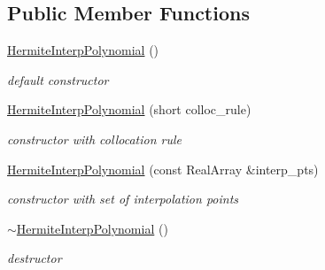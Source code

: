 \subsection*{Public Member Functions}
\begin{DoxyCompactItemize}
\item 
\hyperlink{classPecos_1_1HermiteInterpPolynomial_ae13b0c3cd4bfb21c1e46fcd1deef7752}{Hermite\+Interp\+Polynomial} ()\label{classPecos_1_1HermiteInterpPolynomial_ae13b0c3cd4bfb21c1e46fcd1deef7752}

\begin{DoxyCompactList}\small\item\em default constructor \end{DoxyCompactList}\item 
\hyperlink{classPecos_1_1HermiteInterpPolynomial_aee3ed983c4e1ada90870429465dfdd3f}{Hermite\+Interp\+Polynomial} (short colloc\+\_\+rule)\label{classPecos_1_1HermiteInterpPolynomial_aee3ed983c4e1ada90870429465dfdd3f}

\begin{DoxyCompactList}\small\item\em constructor with collocation rule \end{DoxyCompactList}\item 
\hyperlink{classPecos_1_1HermiteInterpPolynomial_a3c90ca2245416714d418763bfaab1464}{Hermite\+Interp\+Polynomial} (const Real\+Array \&interp\+\_\+pts)\label{classPecos_1_1HermiteInterpPolynomial_a3c90ca2245416714d418763bfaab1464}

\begin{DoxyCompactList}\small\item\em constructor with set of interpolation points \end{DoxyCompactList}\item 
\hyperlink{classPecos_1_1HermiteInterpPolynomial_aa5e6863d8ffc9bca8b5fbd2babff8426}{$\sim$\+Hermite\+Interp\+Polynomial} ()\label{classPecos_1_1HermiteInterpPolynomial_aa5e6863d8ffc9bca8b5fbd2babff8426}

\begin{DoxyCompactList}\small\item\em destructor \end{DoxyCompactList}\end{DoxyCompactItemize}
